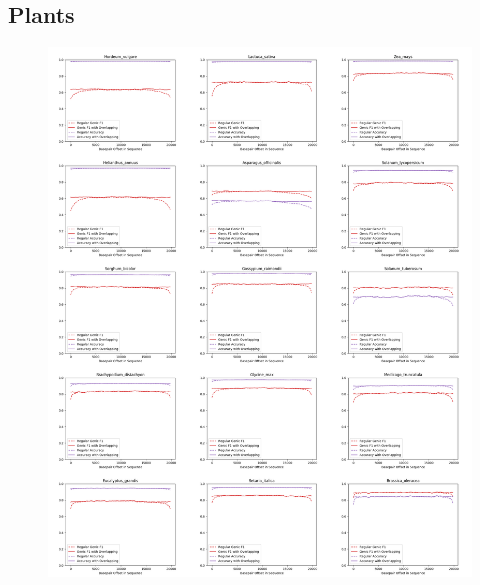 \documentclass{article}
\begin{document}
\clearpage
\subsection{Plants}

\begin{figure}[!h]
\centerline{\includegraphics[width=\overlapscale\textwidth]{images/overlapping/montage_plants1}}
\end{figure}
\end{document}
